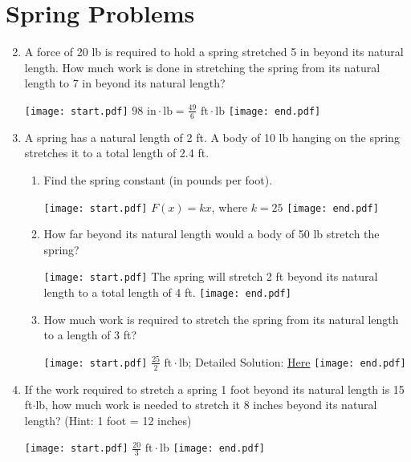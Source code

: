 \documentclass[12pt]{article}
\begin{document}
\section*{Spring Problems}

\begin{enumerate}
\setcounter{enumi}{1}

\item A force of 20 lb is required to hold a spring stretched 5 in beyond its natural length.  How much work is done in stretching the spring from its natural length to 7 in beyond its natural length?

\texttt{[image: start.pdf]}
{{$98 \text{ in}\cdot\text{lb}=\frac{49}{6} \text{ ft}\cdot\text{lb}$ }}
\texttt{[image: end.pdf]}


\item A spring has a natural length of 2 ft.  A body of 10 lb hanging on the spring stretches it to a total length of 2.4 ft.

\begin{enumerate}

\item Find the spring constant (in pounds per foot).

\texttt{[image: start.pdf]}
{{$F(x)=kx$, where $k=25$}}
\texttt{[image: end.pdf]}


\item  How far beyond its natural length would a body of 50 lb stretch the spring?

\texttt{[image: start.pdf]}
{{The spring will stretch 2 ft beyond its natural length to a total length of 4 ft.}}
\texttt{[image: end.pdf]}


\item How much work is required to stretch the spring from its natural length to a length of 3 ft?

\texttt{[image: start.pdf]}
{{$\frac{25}{2} \text{ ft}\cdot\text{lb}$; Detailed Solution: \textcolor{blue}{\href{http://www.math.drexel.edu/classes/Calculus/resources/Math122HW/Solutions/122_10_Work_03.pdf}{Here}}}}
\texttt{[image: end.pdf]}


\end{enumerate}

\item If the work required to stretch a spring 1 foot beyond its natural length is 15 ft$\cdot$lb, how much work is needed to stretch it 8 inches beyond its natural length? (Hint: 1 foot = 12 inches)

\texttt{[image: start.pdf]}
{{$\frac{20}{3} \text{ ft}\cdot\text{lb}$}}
\texttt{[image: end.pdf]}


\end{enumerate}
\end{document}
